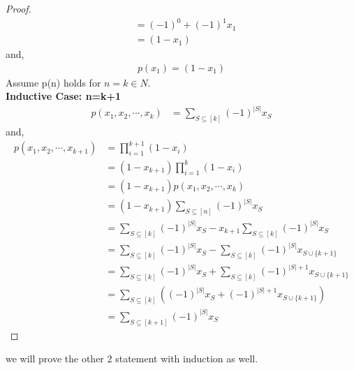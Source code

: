 \documentclass{article}
\begin{document}
\begin{enumerate}
\begin{proof}
\begin{align*}
            &= (-1)^0+(-1)^1x_1\\
            &= (1 -x_1)
        \end{align*}
        and,
        \begin{align*}
            p(x_1)=(1-x_1)
        \end{align*}
        Assume p(n) holds for $n=k \in N$.\\
        \textbf{Inductive Case: n=k+1}\\
        \begin{align*}
            p(x_1,x_2,\cdots,x_k)&=\sum_{S \subseteq [k]}(-1)^{|S|}x_S
        \end{align*}
        and, 
        \begin{align*}
            p(x_1,x_2,\cdots,x_{k+1})&=\prod_{i=1}^{k+1}(1-x_i)\\
            &=(1-x_{k+1})\prod_{i=1}^{k}(1-x_i)\\
            &=(1-x_{k+1})p(x_1,x_2,\cdots,x_k)\\
            &=(1-x_{k+1})\sum_{S \subseteq [n]}(-1)^{|S|}x_S\\
            &=\sum_{S \subseteq [k]}(-1)^{|S|}x_S-x_{k+1}\sum_{S \subseteq [k]}(-1)^{|S|}x_S\\
            &= \sum_{S \subseteq [k]}(-1)^{|S|}x_S-\sum_{S \subseteq [k]}(-1)^{|S|}x_{S \cup \{k+1\}}\\
            &=\sum_{S \subseteq [k]}(-1)^{|S|}x_S+\sum_{S \subseteq [k]}(-1)^{|S|+1}x_{S \cup \{k+1\}}\\
            &=\sum_{S \subseteq [k]} \left ((-1)^{|S|}x_S+(-1)^{|S|+1}x_{S \cup \{k+1\}}\right)\\
            &= \sum_{S \subseteq [k+1]} (-1)^{|S|}x_{S}
        \end{align*}
    \end{proof}
    we will prove the other 2 statement with induction as well.


\end{enumerate}
\end{document}
